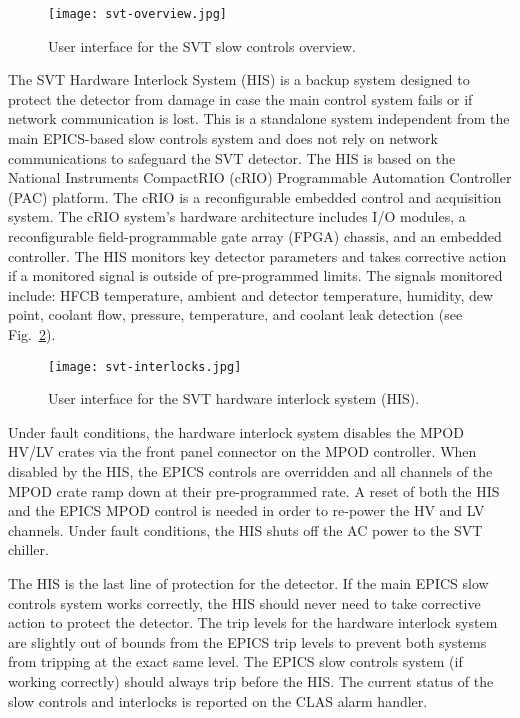 \begin{figure}[hbt] 
\centering 
\texttt{[image: svt-overview.jpg]}
\caption{User interface for the SVT slow controls overview.}
\label{fig:svt-overview}
\end{figure}

The SVT Hardware Interlock System (HIS) is a backup system designed to protect the detector from damage in case the main control system fails or if network communication is lost. This is a standalone system independent from the main EPICS-based slow controls system and does not rely on network communications to safeguard the SVT detector. The HIS is based on the National Instruments CompactRIO (cRIO) Programmable Automation Controller (PAC) platform. The cRIO is a reconfigurable embedded control and acquisition system. The cRIO system's hardware architecture includes I/O modules, a reconfigurable field-programmable gate array (FPGA) chassis, and an embedded controller. The HIS monitors key detector parameters and takes corrective action if a monitored signal is outside of pre-programmed limits. The signals monitored include: HFCB temperature, ambient and detector temperature, humidity, dew point, coolant flow, pressure, temperature, and coolant leak detection (see Fig.~\ref{fig:svt-interlocks}). 

\begin{figure}[hbt] 
\centering 
\texttt{[image: svt-interlocks.jpg]}
\caption{User interface for the SVT hardware interlock system (HIS).}
\label{fig:svt-interlocks}
\end{figure}

Under fault conditions, the hardware interlock system disables the MPOD HV/LV crates via the front panel connector on the MPOD controller. When disabled by the HIS, the EPICS controls are overridden and all channels of the MPOD crate ramp down at their pre-programmed rate. A reset of both the HIS and the EPICS MPOD control is needed in order to re-power the HV and LV channels. Under fault conditions, the HIS shuts off the AC power to the SVT chiller. 

The HIS is the last line of protection for the detector. If the main EPICS slow controls system works correctly, the HIS should never need to take corrective action to protect the detector. The trip levels for the hardware interlock system are slightly out of bounds from the EPICS trip levels to prevent both systems from tripping at the exact same level. The EPICS slow controls system (if working correctly) should always trip before the HIS. The current status of the slow controls and interlocks is reported on the CLAS alarm handler. 

